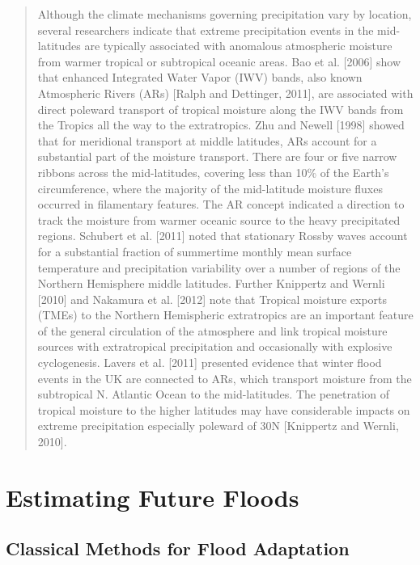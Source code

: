 \documentclass[11pt]{article}
\begin{document}
\begin{quotation}
	Although the climate mechanisms governing precipitation vary by location, several researchers indicate that extreme precipitation events in the mid-latitudes are typically associated with anomalous atmospheric moisture from warmer tropical or subtropical oceanic areas.
	Bao et al. [2006] show that enhanced Integrated Water Vapor (IWV) bands, also known Atmospheric Rivers (ARs) [Ralph and Dettinger, 2011], are associated with direct poleward transport of tropical moisture along the IWV bands from the Tropics all the way to the extratropics.
	Zhu and Newell [1998] showed that for meridional transport at middle latitudes, ARs account for a substantial part of the moisture transport.
	There are four or five narrow ribbons across the mid-latitudes, covering less than 10\% of the Earth's circumference, where the majority of the mid-latitude moisture fluxes occurred in filamentary features.
	The AR concept indicated a direction to track the moisture from warmer oceanic source to the heavy precipitated regions.
	Schubert et al. [2011] noted that stationary Rossby waves account for a substantial fraction of summertime monthly mean surface temperature and precipitation variability over a number of regions of the Northern Hemisphere middle latitudes.
	Further Knippertz and Wernli [2010] and Nakamura et al. [2012] note that Tropical moisture exports (TMEs) to the Northern Hemispheric extratropics are an important feature of the general circulation of the atmosphere and link tropical moisture sources with extratropical precipitation and occasionally with explosive cyclogenesis.
	Lavers et al. [2011] presented evidence that winter flood events in the UK are connected to ARs, which transport moisture from the subtropical N. Atlantic Ocean to the mid-latitudes.
	The penetration of tropical moisture to the higher latitudes may have considerable impacts on extreme precipitation especially poleward of 30N [Knippertz and Wernli, 2010].
\end{quotation}

\section{Estimating Future Floods}

\subsection{Classical Methods for Flood Adaptation}
\end{document}

